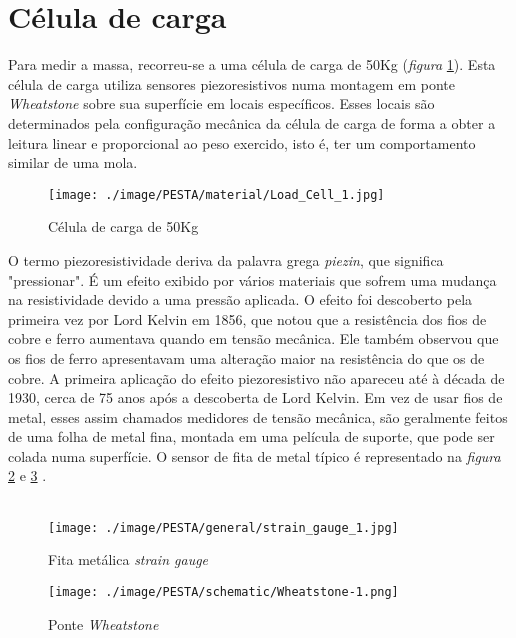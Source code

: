 \section{Célula de carga}
Para medir a massa, recorreu-se a uma célula de carga de 50Kg (\textit{figura} \ref{Load_Cell_1}). Esta célula de carga utiliza sensores piezoresistivos numa montagem em ponte \textit{Wheatstone} sobre sua superfície em locais específicos. Esses locais são determinados pela configuração mecânica da célula de carga de forma a obter a leitura linear e proporcional ao peso exercido, isto é, ter um comportamento similar de uma mola.
\\
\begin{figure}[H]
	\centering
	\texttt{[image: ./image/PESTA/material/Load\_Cell\_1.jpg]}
	\caption{Célula de carga de 50Kg}
	\label{Load_Cell_1}
\end{figure}
O termo piezoresistividade deriva da palavra grega \textit{piezin}, que significa "pressionar". É um efeito exibido por vários materiais que sofrem uma mudança na resistividade devido a uma pressão aplicada. O efeito foi descoberto pela primeira vez por Lord Kelvin em 1856, que notou que a resistência dos fios de cobre e ferro aumentava quando em tensão mecânica. Ele também observou que os fios de ferro apresentavam uma alteração maior na resistência do que os de cobre. A primeira aplicação do efeito piezoresistivo não apareceu até à década de 1930, cerca de 75 anos após a descoberta de Lord Kelvin. Em vez de usar fios de metal, esses assim chamados medidores de tensão mecânica, são geralmente feitos de uma folha de metal fina, montada em uma película de suporte, que pode ser colada numa superfície. O sensor de fita de metal típico é representado na \textit{figura} \ref{strain_gauge_1} e \ref{wheatstone-1} \cite{book-9}.
\\
\\
\begin{minipage}[!b]{.5\linewidth}
\begin{figure}[H]
	\captionsetup{justification=raggedright,singlelinecheck=false}
	\flushleft
	\texttt{[image: ./image/PESTA/general/strain\_gauge\_1.jpg]}
	\caption{Fita metálica \textit{strain gauge} \cite{book-9}}
	\label{strain_gauge_1}
\end{figure}
\end{minipage}
\begin{minipage}[!b]{.5\linewidth}
\begin{figure}[H]
	\captionsetup{justification=raggedright,singlelinecheck=false}
	\flushleft
	\vspace{1cm}
	\texttt{[image: ./image/PESTA/schematic/Wheatstone-1.png]}
	\qquad \caption{Ponte \textit{Wheatstone}}
	\label{wheatstone-1}
\end{figure}
\end{minipage}
